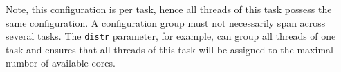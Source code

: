 Note, this configuration is per task, hence all threads of this task possess
the same configuration.
A configuration group must not necessarily span across several tasks.
The \texttt{distr} parameter, for example, can group all threads of one task
and ensures that all threads of this task will be assigned to the maximal
number of available cores.
\\
\newline



